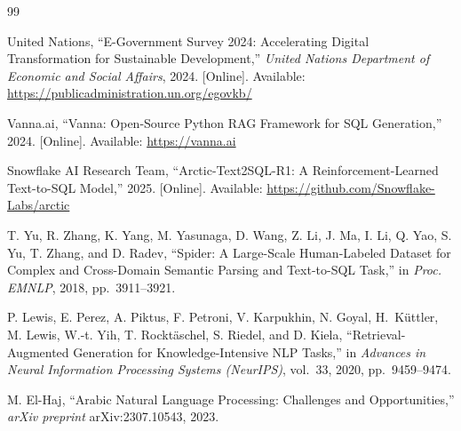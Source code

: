 %
\begin{thebibliography}{99}
\renewcommand{\baselinestretch}{1.0}\small
\setlength{\parskip}{0pt}

\textenglish{United Nations, ``E-Government Survey 2024: Accelerating Digital Transformation for Sustainable Development,'' \textit{United Nations Department of Economic and Social Affairs}, 2024. [Online]. Available: \url{https://publicadministration.un.org/egovkb/}}

\textenglish{Vanna.ai, ``Vanna: Open-Source Python RAG Framework for SQL Generation,'' 2024. [Online]. Available: \url{https://vanna.ai}}

\textenglish{Snowflake AI Research Team, ``Arctic-Text2SQL-R1: A Reinforcement-Learned Text-to-SQL Model,'' 2025. [Online]. Available: \url{https://github.com/Snowflake-Labs/arctic}}

\textenglish{T. Yu, R. Zhang, K. Yang, M. Yasunaga, D. Wang, Z. Li, J. Ma, I. Li, Q. Yao, S. Yu, T. Zhang, and D. Radev, ``Spider: A Large-Scale Human-Labeled Dataset for Complex and Cross-Domain Semantic Parsing and Text-to-SQL Task,'' in \textit{Proc. EMNLP}, 2018, pp.~3911--3921.}

\textenglish{P. Lewis, E. Perez, A. Piktus, F. Petroni, V. Karpukhin, N. Goyal, H.~K\"uttler, M. Lewis, W.-t. Yih, T. Rockt\"aschel, S. Riedel, and D. Kiela, ``Retrieval-Augmented Generation for Knowledge-Intensive NLP Tasks,'' in \textit{Advances in Neural Information Processing Systems (NeurIPS)}, vol.~33, 2020, pp.~9459--9474.}

\textenglish{M. El-Haj, ``Arabic Natural Language Processing: Challenges and Opportunities,'' \textit{arXiv preprint} arXiv:2307.10543, 2023.}


\end{thebibliography}
